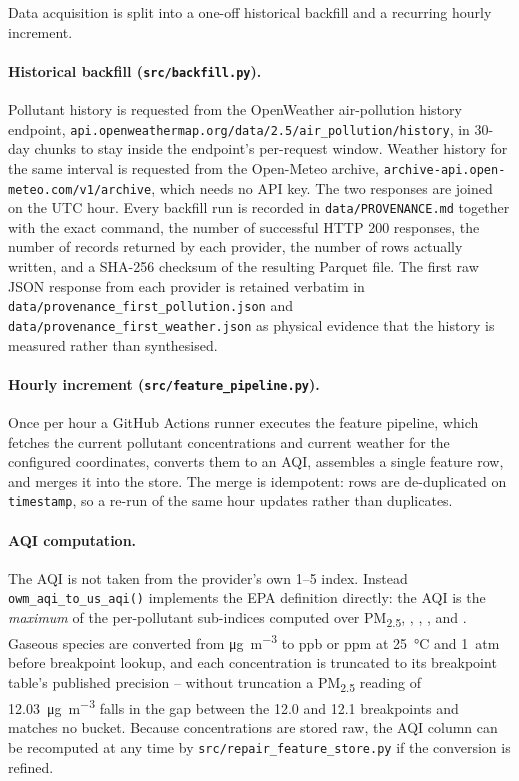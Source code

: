 \documentclass[11pt,a4paper]{article}
\newcommand{\pmfine}{PM\textsubscript{2.5}\xspace}
\begin{document}
Data acquisition is split into a one-off historical backfill and a recurring
hourly increment.

\paragraph{Historical backfill (\texttt{src/backfill.py}).}
Pollutant history is requested from the OpenWeather air-pollution history
endpoint,
\texttt{api.openweathermap.org/data/2.5/air\_pollution/history}, in
30-day chunks to stay inside the endpoint's per-request window. Weather history
for the same interval is requested from the Open-Meteo archive,
\texttt{archive-api.open-meteo.com/v1/archive}, which needs no API key. The two
responses are joined on the UTC hour. Every backfill run is recorded in
\texttt{data/PROVENANCE.md} together with the exact command, the number of
successful HTTP 200 responses, the number of records returned by each provider,
the number of rows actually written, and a SHA-256 checksum of the resulting
Parquet file. The first raw JSON response from each provider is retained
verbatim in \texttt{data/provenance\_first\_pollution.json} and
\texttt{data/provenance\_first\_weather.json} as physical evidence that the
history is measured rather than synthesised.

\paragraph{Hourly increment (\texttt{src/feature\_pipeline.py}).}
Once per hour a GitHub Actions runner executes the feature pipeline, which
fetches the current pollutant concentrations and current weather for the
configured coordinates, converts them to an AQI, assembles a single feature
row, and merges it into the store. The merge is idempotent: rows are
de-duplicated on \texttt{timestamp}, so a re-run of the same hour updates
rather than duplicates.

\paragraph{AQI computation.}
The AQI is not taken from the provider's own 1--5 index. Instead
\texttt{owm\_aqi\_to\_us\_aqi()} implements the EPA definition directly: the
AQI is the \emph{maximum} of the per-pollutant sub-indices computed over
\pmfine, , , ,  and . Gaseous species
are converted from \si{\micro\gram\per\cubic\metre} to ppb or ppm at
\SI{25}{\celsius} and \SI{1}{atm} before breakpoint lookup, and each
concentration is truncated to its breakpoint table's published precision --
without truncation a \pmfine reading of \SI{12.03}{\micro\gram\per\cubic\metre}
falls in the gap between the 12.0 and 12.1 breakpoints and matches no bucket.
Because concentrations are stored raw, the AQI column can be recomputed at any
time by \texttt{src/repair\_feature\_store.py} if the conversion is refined.
\end{document}

